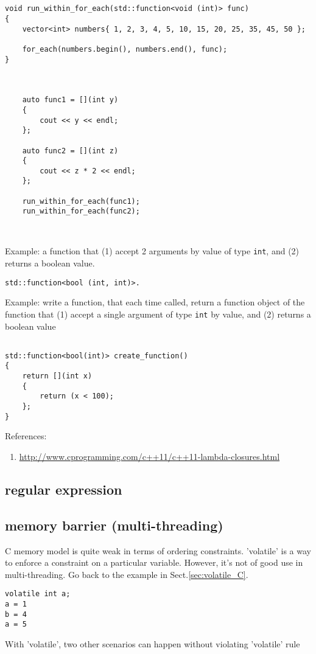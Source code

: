 \begin{lstlisting}


void run_within_for_each(std::function<void (int)> func)
{
    vector<int> numbers{ 1, 2, 3, 4, 5, 10, 15, 20, 25, 35, 45, 50 };
 
    for_each(numbers.begin(), numbers.end(), func);
}
 
 
 
    auto func1 = [](int y)
    {
        cout << y << endl;
    };
 
    auto func2 = [](int z)
    {
        cout << z * 2 << endl;
    };
 
    run_within_for_each(func1);
    run_within_for_each(func2);
    
    
\end{lstlisting}


Example: a function that (1) accept 2 arguments by value of type \verb!int!,
and (2) returns a boolean value.

\begin{verbatim}
std::function<bool (int, int)>.
\end{verbatim}

Example: write a function, that each time called, return a function object of the function 
that (1) accept a single argument of type \verb!int! by value, and (2) returns a boolean value

\begin{lstlisting}

std::function<bool(int)> create_function()
{
    return [](int x)
    {
        return (x < 100);
    };
}
\end{lstlisting}

References:
\begin{enumerate}
  \item \url{http://www.cprogramming.com/c++11/c++11-lambda-closures.html}
\end{enumerate}

\subsection{regular expression}


\subsection{memory barrier (multi-threading)}

C memory model is quite weak in terms of ordering constraints. 'volatile' is a
way to enforce a constraint on a particular variable. However, it's not of good
use in multi-threading. Go back to the example in Sect.\ref{sec:volatile_C}. 
\begin{lstlisting}
volatile int a;
a = 1
b = 4
a = 5
\end{lstlisting}
With 'volatile', two other scenarios can happen without violating 'volatile'
rule

